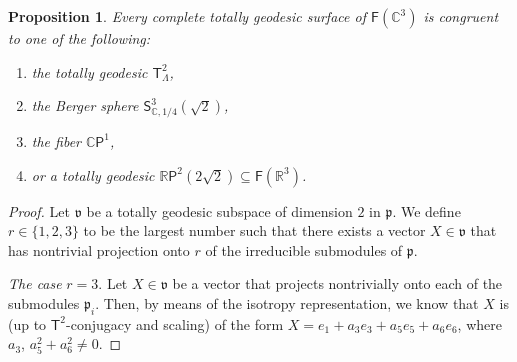 \documentclass[11pt,a4paper,final]{amsart}
\newcommand{\s}{\mathsf}
\newcommand{\g}{\mathfrak}
\newcommand{\R}{\mathbb{R}}
\newcommand{\C}{\mathbb{C}}
\newtheorem{proposition}[theorem]{Proposition}
\theoremstyle{definition}
\begin{document}
\begin{proposition}
	\label{prop:2tgflag}
	Every complete totally geodesic surface of $\mathsf{F}(\C^{3})$ is congruent to one of the following:
		\begin{enumerate}[\rm (i)]
			\item the totally geodesic $\mathsf{T}^2_{\Lambda}$,
			\item the  Berger sphere $\s{S}^3_{\C,1/4}(\sqrt{2})$,
			\item the fiber $\C\s{P}^1$,
			\item or a totally geodesic $\R\mathsf{P}^{2}\left(2\sqrt{2}\right)\subseteq \mathsf{F}(\R^{3})$.
		\end{enumerate}
\end{proposition}
\begin{proof}
	Let $\g{v}$ be a totally geodesic subspace of dimension $2$ in $\g{p}$.
	We define $r\in\{1,2,3\}$ to be the largest number such that there exists a vector $X\in \g{v}$ that has nontrivial projection onto $r$ of the irreducible submodules of $\g{p}$.
		
	\textit{The case} $r=3$.
	Let $X\in \g{v}$ be a vector that projects nontrivially onto each of the submodules $\g{p}_{i}$.
	Then, by means of the isotropy representation, we know that $X$ is (up to $\mathsf{T}^2$-conjugacy and scaling) of the form
	$X=e_{1}+a_{3}e_{3}+a_{5}e_{5}+a_{6}e_{6}$,
	where $a_{3}$, $a_{5}^{2}+a_{6}^{2}\neq 0$.
		

\end{proof}
\end{document}
